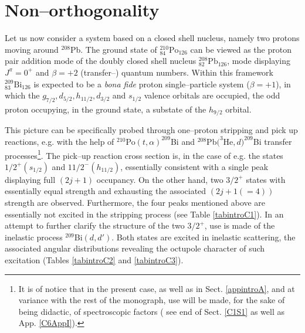 \section{Non--orthogonality}\label{appintroC}
Let us now consider a system based on a  closed shell nucleus, namely two protons moving around $^{208}$Pb.
The ground state of $^{210}_{84}\text{Po}_{126}$ can be viewed as the proton pair addition mode of the doubly closed shell nucleus  $^{208}_{82}\text{Pb}_{126}$, mode displaying $J^\pi=0^+$ and $\beta=+2$ (transfer--) quantum numbers. Within this framework $^{209}_{83}\text{Bi}_{126}$ is expected to be a \emph{bona fide} proton single--particle system ($\beta=+1$), in which the $g_{7/2},d_{5/2},h_{11/2},d_{3/2}$ and $s_{1/2}$ valence orbitals are occupied, the odd proton occupying, in the ground state, a substate of the $h_{9/2}$ orbital.



This picture can be specifically probed through one--proton stripping and pick up reactions, e.g. with the help of $^{210}$Po$(t,\alpha)^{209}$Bi and $^{208}$Pb$(^3$He$,d)^{209}$Bi transfer processes\footnote{It is of notice that in the present case, as well as in Sect. \ref{appintroA}, and at variance with the rest of the monograph, use will be made, for the sake of being didactic, of spectroscopic factors ( see end of Sect. \ref{C1S1} as well as App. \ref{C6AppI}).}. The pick--up reaction cross section is, in the case of e.g. the states $1/2^+(s_{1/2})$ and $11/2^-(h_{11/2})$,  essentially consistent with a single peak displaying full $(2j+1)$ occupancy. On the other hand, two $3/2^+$ states with essentially equal strength and exhausting the associated $(2j+1(=4))$ strength are observed.   Furthermore,  the four peaks mentioned above are essentially not excited in the stripping process (see Table \ref{tabintroC1}). In an attempt to further clarify the structure of the two $3/2^+$, use is made of the inelastic process $^{209}$Bi$(d,d')$. Both states are excited in  inelastic scattering, the associated  angular distributions  revealing the octupole character of such excitation (Tables \ref{tabintroC2} and \ref{tabintroC3}).

